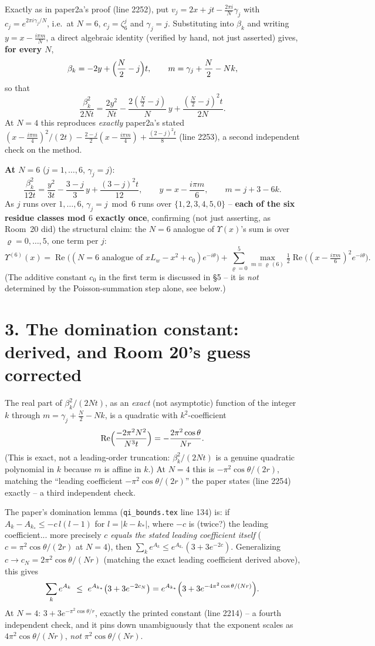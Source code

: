 \documentclass[11pt]{article}
\begin{document}
Exactly as in paper2a's proof (line 2252), put $v_j=2x+jt-\frac{2\pi i}N\gamma_j$ with
$c_j=e^{2\pi i\gamma_j/N}$, i.e.\ at $N=6$, $c_j=\zeta_6^j$ and $\gamma_j=j$. Substituting into
$\beta_k$ and writing $y=x-\frac{i\pi m}N$, a direct algebraic identity (verified by hand, not
just asserted) gives, \textbf{for every $N$},
\[
  \beta_k=-2y+\Bigl(\frac N2-j\Bigr)t,\qquad m=\gamma_j+\frac N2-Nk,
\]
so that
\[
  \frac{\beta_k^2}{2Nt}=\frac{2y^2}{Nt}-\frac{2(\frac N2-j)}N\,y+\frac{(\frac N2-j)^2t}{2N}.
\]
At $N=4$ this reproduces \emph{exactly} paper2a's stated
$(x-\frac{i\pi m}4)^2/(2t)-\frac{2-j}2(x-\frac{i\pi m}4)+\frac{(2-j)^2t}8$ (line 2253), a second
independent check on the method.

\textbf{At $N=6$} ($j=1,\dots,6$, $\gamma_j=j$):
\[
  \frac{\beta_k^2}{12t}=\frac{y^2}{3t}-\frac{3-j}3\,y+\frac{(3-j)^2t}{12},\qquad
  y=x-\frac{i\pi m}6,\qquad m=j+3-6k.
\]
As $j$ runs over $1,\dots,6$, $\gamma_j=j\bmod6$ runs over $\{1,2,3,4,5,0\}$ -- \textbf{each of the
six residue classes mod $6$ exactly once}, confirming (not just asserting, as Room~20 did) the
structural claim: the $N=6$ analogue of $\Upsilon(x)$'s sum is over $\varrho=0,\dots,5$, one term
per $j$:
\[
  \Upsilon^{(6)}(x)=\operatorname{Re}\bigl((\text{$N=6$ analogue of }xL_w-x^2+c_0)e^{-i\theta}\bigr)
  +\sum_{\varrho=0}^{5}\max_{m\equiv\varrho\,(6)}\tfrac12\operatorname{Re}\bigl((x-\tfrac{i\pi
  m}6)^2e^{-i\theta}\bigr).
\]
(The additive constant $c_0$ in the first term is discussed in \S5 -- it is \emph{not} determined
by the Poisson-summation step alone, see below.)

\section*{3. The domination constant: derived, and Room 20's guess corrected}

The real part of $\beta_k^2/(2Nt)$, as an \emph{exact} (not asymptotic) function of the integer
$k$ through $m=\gamma_j+\frac N2-Nk$, is a quadratic with $k^2$-coefficient
\[
  \operatorname{Re}\Bigl(\frac{-2\pi^2N^2}{N^3t}\Bigr)=-\frac{2\pi^2\cos\theta}{Nr}.
\]
(This is exact, not a leading-order truncation: $\beta_k^2/(2Nt)$ is a genuine quadratic
polynomial in $k$ because $m$ is affine in $k$.) At $N=4$ this is $-\pi^2\cos\theta/(2r)$,
matching the ``leading coefficient $-\pi^2\cos\theta/(2r)$'' the paper states (line 2254) exactly
-- a third independent check.

The paper's domination lemma (\texttt{qi\_bounds.tex} line 134) is: if $A_k-A_{k_*}\le
-c\,l(l-1)$ for $l=|k-k_*|$, where $-c$ is (twice?) the leading coefficient... more precisely
\emph{$c$ equals the stated leading coefficient itself} ($c=\pi^2\cos\theta/(2r)$ at $N=4$), then
$\sum_ke^{A_k}\le e^{A_{k_*}}(3+3e^{-2c})$. Generalizing $c\to c_N=2\pi^2\cos\theta/(Nr)$ (matching
the exact leading coefficient derived above), this gives
\[
  \sum_ke^{A_k}\ \le\ e^{A_{k_*}}\bigl(3+3e^{-2c_N}\bigr)=e^{A_{k_*}}\Bigl(3+3e^{-4\pi^2\cos\theta/
  (Nr)}\Bigr).
\]
At $N=4$: $3+3e^{-\pi^2\cos\theta/r}$, exactly the printed constant (line 2214) -- a fourth
independent check, and it pins down unambiguously that the exponent scales as $4\pi^2\cos\theta/
(Nr)$, \emph{not} $\pi^2\cos\theta/(Nr)$.
\end{document}
